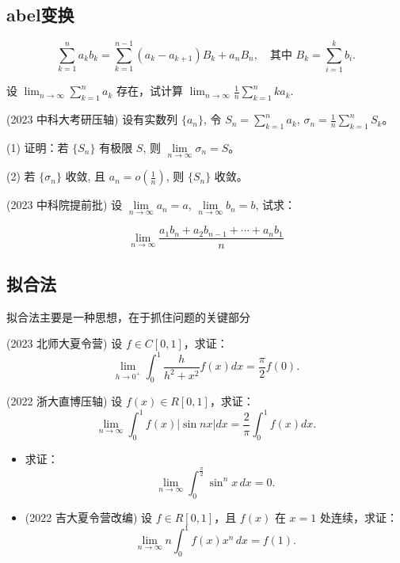 \documentclass[lang=cn,10pt,thmcnt=section]{elegantbook}
\begin{document}
\subsection{abel变换}
\begin{theorem}
	\[
\sum_{k=1}^n a_k b_k = \sum_{k=1}^{n-1} (a_k - a_{k+1}) B_k + a_n B_n, \quad \text{其中 } B_k = \sum_{i=1}^k b_i.
\]
\end{theorem}
\begin{example}
	设 $\lim_{n \to \infty} \sum_{k=1}^n a_k$ 存在，试计算 $\lim_{n \to \infty} \frac{1}{n} \sum_{k=1}^n k a_k$.
\end{example}
\begin{example}
	(2023 中科大考研压轴) 设有实数列 $\{a_n\}$, 令 $S_n = \sum\limits_{k=1}^n a_k$, $\sigma_n = \frac{1}{n}\sum\limits_{k=1}^n S_k$。

(1) 证明：若 $\{S_n\}$ 有极限 $S$, 则 $\lim\limits_{n \to \infty} \sigma_n = S$。

(2) 若 $\{\sigma_n\}$ 收敛, 且 $a_n = o\left(\frac{1}{n}\right)$, 则 $\{S_n\}$ 收敛。

\end{example}
\begin{example}
	(2023 中科院提前批) 设 $\lim\limits_{n \to \infty} a_n = a$, $\lim\limits_{n \to \infty} b_n = b$, 试求：

\[
\lim_{n \to \infty} \frac{a_1 b_n + a_2 b_{n-1} + \cdots + a_n b_1}{n}
\]


\end{example}
\subsection{拟合法}
拟合法主要是一种思想，在于抓住问题的关键部分
\begin{example}
	(2023 北师大夏令营) 设 $f \in C[0,1]$，求证：
\[
\lim_{h \to 0^+} \int_0^1 \frac{h}{h^2 + x^2} f(x) dx = \frac{\pi}{2} f(0).
\]

\end{example}
\begin{example}
	(2022 浙大直博压轴) 设 $f(x) \in R[0,1]$，求证：
\[
\lim_{n \to \infty} \int_0^1 f(x) |\sin nx| dx = \frac{2}{\pi} \int_0^1 f(x) dx.
\]

\end{example}
\begin{example}
	\begin{itemize}
		\item 求证：
		\[
		\lim_{n \to \infty} \int_0^{\frac{\pi}{2}} \sin^n x \, dx = 0.
		\]
		
		\item (2022 吉大夏令营改编) 设 $f \in R[0,1]$，且 $f(x)$ 在 $x=1$ 处连续，求证：
		\[
		\lim_{n \to \infty} n \int_0^1 f(x) x^n \, dx = f(1).
		\]
	\end{itemize}
\end{example}
\end{document}
